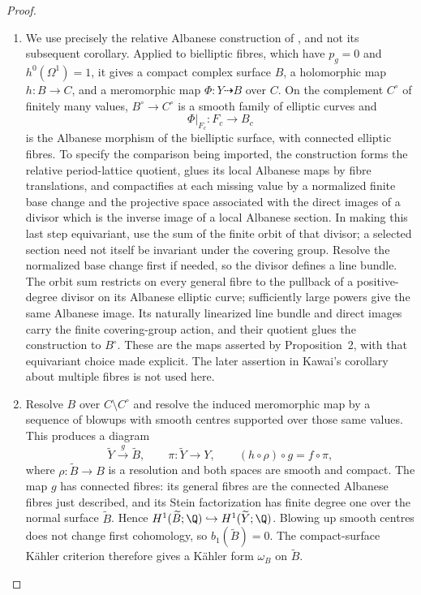 \begin{proof}

\begin{enumerate}[label={$\langle1\rangle$\arabic*.},leftmargin=*]
\item We use precisely the relative Albanese construction of
\cite[Proposition~2, pp.~605--608]{Kawai1969}, and not its subsequent
corollary. Applied to bielliptic fibres, which have
$p_g=0$ and $h^0(\Omega^1)=1$, it gives a compact complex surface
$B$, a holomorphic map $h:B\to C$, and a meromorphic map
$\Phi:Y\dashrightarrow B$ over $C$. On the complement $C^\circ$
of finitely many values, $B^\circ\to C^\circ$ is a smooth family
of elliptic curves and
\[
 \Phi|_{F_c}:F_c\longrightarrow B_c
\]
is the Albanese morphism of the bielliptic surface, with connected
elliptic fibres. To specify the comparison being imported, the
construction forms the relative period-lattice quotient, glues its
local Albanese maps by fibre translations, and compactifies at each
missing value by a normalized finite base change and the projective
space associated with the direct images of a divisor which is the
inverse image of a local Albanese section. In making this last
step equivariant, use the sum of the finite orbit of that divisor;
a selected section need not itself be invariant under the covering
group. Resolve the normalized base change first if needed, so the
divisor defines a line bundle. The orbit sum restricts on every
general fibre to the pullback of a positive-degree divisor on its
Albanese elliptic curve; sufficiently large powers give the same
Albanese image. Its naturally linearized line bundle and direct
images carry the finite covering-group action, and their quotient
glues the construction to $B^\circ$. These are the maps asserted by
Proposition~2, with that equivariant choice made explicit. The
later assertion in Kawai's corollary about multiple fibres is not
used here.

\item Resolve $B$ over $C\setminus C^\circ$ and resolve the induced
meromorphic map by a sequence of blowups with smooth centres
supported over those same values. This produces a diagram
\[
 \widetilde Y\xrightarrow{\ g\ }\widetilde B,
 \qquad \pi:\widetilde Y\longrightarrow Y,
 \qquad (h\circ\rho)\circ g=f\circ\pi,
\]
where $\rho:\widetilde B\to B$ is a resolution and both spaces
are smooth and compact. The map $g$ has connected fibres:
its general fibres are the connected Albanese fibres just described,
and its Stein factorization has finite degree one over the normal
surface $\widetilde B$. Hence
$H^1(\widetilde B;\Q)\hookrightarrow H^1(\widetilde Y;\Q)$.
Blowing up smooth centres does not change first cohomology, so
$b_1(\widetilde B)=0$. The compact-surface K\"ahler criterion
\cite[Theorem~1.1]{Peters1990} therefore gives a K\"ahler form
$\omega_B$ on $\widetilde B$.


\end{enumerate}
\end{proof}
